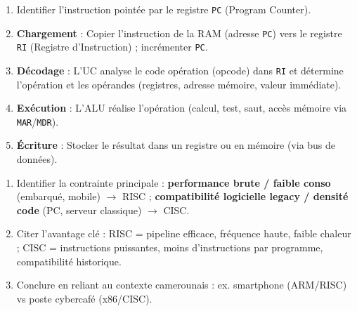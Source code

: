 \documentclass[11pt]{article}
\newcounter{popsec}
\newcounter{popsub}
\newcommand{\courssub}[1]{%
  \stepcounter{popsub}%
  \par\vspace{9pt}\noindent{\popxbold\fontsize{11.5}{13}\selectfont\color{popink}{\color{poporange}\thepopsec.\thepopsub}\hspace{6pt}#1}\par\nopagebreak\vspace{4pt}
}
\begin{document}
\begin{bilan}
\courssub{Méthodes express}
\begin{methode}
  \begin{enumerate}
    \item Identifier l'instruction pointée par le registre \texttt{PC} (Program Counter).
    \item \textbf{Chargement} : Copier l'instruction de la RAM (adresse \texttt{PC}) vers le registre \texttt{RI} (Registre d'Instruction) ; incrémenter \texttt{PC}.
    \item \textbf{Décodage} : L'UC analyse le code opération (opcode) dans \texttt{RI} et détermine l'opération et les opérandes (registres, adresse mémoire, valeur immédiate).
    \item \textbf{Exécution} : L'ALU réalise l'opération (calcul, test, saut, accès mémoire via \texttt{MAR}/\texttt{MDR}).
    \item \textbf{Écriture} : Stocker le résultat dans un registre ou en mémoire (via bus de données).
  \end{enumerate}
\end{methode}

\begin{methode}
  \begin{enumerate}
    \item Identifier la contrainte principale : \textbf{performance brute / faible conso} (embarqué, mobile) $\to$ RISC ; \textbf{compatibilité logicielle legacy / densité code} (PC, serveur classique) $\to$ CISC.
    \item Citer l'avantage clé : RISC = pipeline efficace, fréquence haute, faible chaleur ; CISC = instructions puissantes, moins d'instructions par programme, compatibilité historique.
    \item Conclure en reliant au contexte camerounais : ex. smartphone (ARM/RISC) vs poste cybercafé (x86/CISC).
  \end{enumerate}
\end{methode}
\end{bilan}
\end{document}
